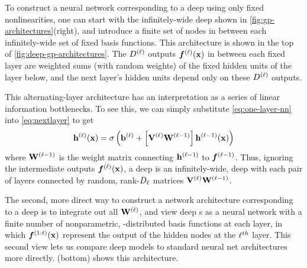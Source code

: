 To construct a neural network corresponding to a deep \gp{} using only fixed nonlinearities, 
one can start with the infinitely-wide deep \gp{} shown in \cref{fig:gp-architectures}(right), and introduce a finite set of nodes in between each infinitely-wide set of fixed basis functions.
This architecture is shown in the top of \cref{fig:deep-gp-architectures}.
The $D^{(\ell)}$ outputs $\boldsymbol{f}^{(\ell)}({\bf{x}})$ in between each fixed layer are weighted sums (with random weights) of the fixed hidden units of the layer below, and the next layer's hidden units depend only on these $D^{(\ell)}$ outputs.

This alternating-layer architecture has an interpretation as a series of linear information bottlenecks.
To see this, we can simply substitute \cref{eq:one-layer-nn} into \cref{eq:nextlayer} to get
%
\begin{align}
{\bf{h}}^{(\ell)}({\bf{x}}) = \sigma \left( {\bf{b}}^{(\ell)} + \left[ \mathbf{V}^{(\ell)} \mathbf{W}^{(\ell-1)} \right] {\bf{h}}^{(\ell-1)}({\bf{x}}) \right)
\end{align}
%
where $\mathbf{W}^{(\ell-1)}$ is the weight matrix connecting ${\bf{h}}^{(\ell-1)}$ to $\boldsymbol{f}^{(\ell - 1)}$.
Thus, ignoring the intermediate outputs $\boldsymbol{f}^{(\ell)}({\bf{x}})$, a deep \gp{} is an infinitely-wide, deep \MLP{} with each pair of layers connected by random, rank-$D_\ell$ matrices $\mathbf{V}^{(\ell)} \mathbf{W}^{(\ell-1)}$.

The second, more direct way to construct a network architecture corresponding to a deep \gp{} is to integrate out all $\mathbf{W}^{(\ell)}$, and view deep \gp{}s as a neural network with a finite number of nonparametric, \gp{}-distributed basis functions at each layer, in which $\boldsymbol{f}^{(1:\ell)}({\bf{x}})$ represent the output of the hidden nodes at the $\ell^{th}$ layer.
This second view lets us compare deep \gp{} models to standard neural net architectures more directly.
(bottom) shows this architecture.




